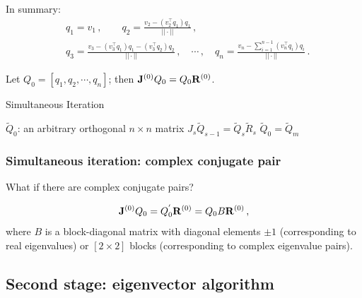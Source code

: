 \documentclass[mathserif, handout]{beamer}
\begin{document}
\begin{frame}[allowframebreaks]
  \begin{block}{In summary:}
    \[
    \begin{aligned}
      & q_{1} = v_{1}\,,\qquad
      q_{2} = \frac{v_{2}-(v_{2}^\top q_{1})q_{1}}{||\cdot ||}\,,\\
      & q_{3} = \frac{v_{3}-(v_{3}^\top q_{1})q_{1}-
        (v_{3}^\top q_{2})q_{2}}{||\cdot ||}\,,\quad \cdots\,,\quad
      q_{n} = \frac{v_{n}-\sum_{i=1}^{n-1}(v_{n}^\top q_{i})q_{i}}{||\cdot ||}
      \,.
    \end{aligned}
    \]
  \end{block}

  Let $Q_{0}=[q_{1},q_{2},\cdots ,q_{n}]$; then
  $\mathbf{J}^{(0)}Q_{0}=Q_{0}\mathbf{R}^{(0)}$.
  \begin{algorithm}[H]
    \caption{Simultaneous Iteration}
    \label{ag:simuliter}
    \begin{algorithmic}
      \State $\tilde{Q}_{0}$: an arbitrary orthogonal $n\times n$ matrix
      \State $J_{s}\tilde{Q}_{s-1}=\tilde{Q}_{s}\tilde{R}_{s}$
      \EndFor
      \State $\tilde{Q}_{0}=\tilde{Q}_{m}$
      \EndFor
    \end{algorithmic}
  \end{algorithm}
  
\end{frame}
\logotrue

\begin{frame}
  \frametitle{Simultaneous iteration: complex conjugate pair}
  \begin{center}
    What if there are complex conjugate pairs?
  \end{center}
  
  \pause
  
  \[
  \mathbf{J}^{(0)}Q_{0}=Q^{'}_{0}\mathbf{R}^{(0)}=Q_{0}B\mathbf{R}^{(0)}
  \,,
  \]
  where $B$ is a {\color{red} block-diagonal} matrix with diagonal elements $\pm 1$
  (corresponding to real eigenvalues) or $[2\!\times\! 2]$ blocks
  (corresponding to complex eigenvalue pairs).
  
\end{frame}


\subsection{Second stage: eigenvector algorithm}
\end{document}
